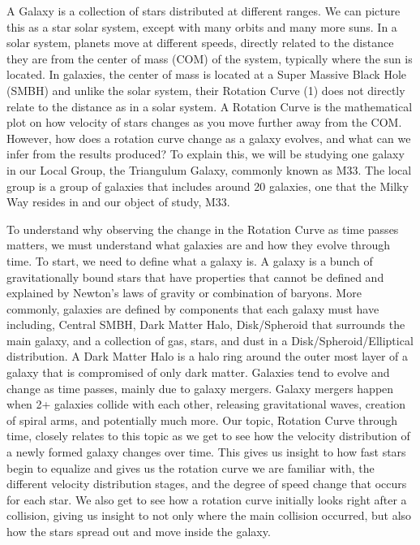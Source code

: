 \documentclass[modern]{aastex61}
\begin{document}
A Galaxy is a collection of stars distributed at different ranges. We can picture this as a star solar system, except with many orbits and many more suns. In a solar system, planets move at different speeds, directly related to the distance they are from the center of mass (COM) of the system, typically where the sun is located. In galaxies, the center of mass is located at a Super Massive Black Hole (SMBH) and unlike the solar system, their Rotation Curve (1) does not directly relate to the distance as in a solar system. A Rotation Curve is the mathematical plot on how velocity of stars changes as you move further away from the COM. However, how does a rotation curve change as a galaxy evolves, and what can we infer from the results produced? To explain this, we will be studying one galaxy in our Local Group, the Triangulum Galaxy, commonly known as M33. The local group is a group of galaxies that includes around 20 galaxies, one that the Milky Way resides in and our object of study, M33.

To understand why observing the change in the Rotation Curve as time passes matters, we must understand what galaxies are and how they evolve through time. To start, we need to define what a galaxy is. A galaxy is a bunch of gravitationally bound stars that have properties that cannot be defined and explained by Newton's laws of gravity or combination of baryons. More commonly, galaxies are defined by components that each galaxy must have including, Central SMBH, Dark Matter Halo, Disk/Spheroid that surrounds the main galaxy, and a collection of gas, stars, and dust in a Disk/Spheroid/Elliptical distribution. A Dark Matter Halo is a halo ring around the outer most layer of a galaxy that is compromised of only dark matter. Galaxies tend to evolve and change as time passes, mainly due to galaxy mergers. Galaxy mergers happen when 2+ galaxies collide with each other, releasing gravitational waves, creation of spiral arms, and potentially much more. Our topic, Rotation Curve through time, closely relates to this topic as we get to see how the velocity distribution of a newly formed galaxy changes over time. This gives us insight to how fast stars begin to equalize and gives us the rotation curve we are familiar with, the different velocity distribution stages, and the degree of speed change that occurs for each star. We also get to see how a rotation curve initially looks right after a collision, giving us insight to not only where the main collision occurred, but also how the stars spread out and move inside the galaxy.
\end{document}
